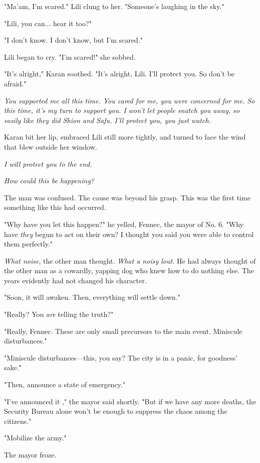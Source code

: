 "Ma'am, I'm scared." Lili clung to her. "Someone's laughing in the sky."

"Lili, you can... hear it too?"

"I don't know. I don't know, but I'm scared."

Lili began to cry. "I'm scared!" she sobbed.

"It's alright," Karan soothed. "It's alright, Lili. I'll protect you. So
don't be afraid."

\emph{You supported me all this time. You cared for me, you were concerned for
me. So this time, it's my turn to support you. I won't let people snatch
you away, so easily like they did Shion and Safu. I'll protect you, you
just watch.}

Karan bit her lip, embraced Lili still more tightly, and turned to face
the wind that blew outside her window.

\emph{I will protect you to the end.}

\mybreak

\emph{How could this be happening?}

The man was confused. The cause was beyond his grasp. This was the first
time something like this had occurred.

"Why have you let this happen?" he yelled, Fennec, the mayor of No. 6.
"Why have \emph{they} begun to act on their own? I thought you said you were
able to control them perfectly."

\emph{What noise}, the other man thought. \emph{What a noisy lout.} He had always
thought of the other man as a cowardly, yapping dog who knew how to do
nothing else. The years evidently had not changed his character.

"Soon, it will awaken. Then, everything will settle down."

"Really? You \emph{are} telling the truth?"

"Really, Fennec. These are only small precursors to the main event.
Miniscule disturbances."

"Miniscule disturbances---this, you say? The city is in a panic, for
goodness' sake."

"Then, announce a state of emergency."

"I've announced it ," the mayor said shortly. "But if we have any more
deaths, the Security Bureau alone won't be enough to suppress the chaos
among the citizens."

"Mobilize the army."

The mayor froze.

